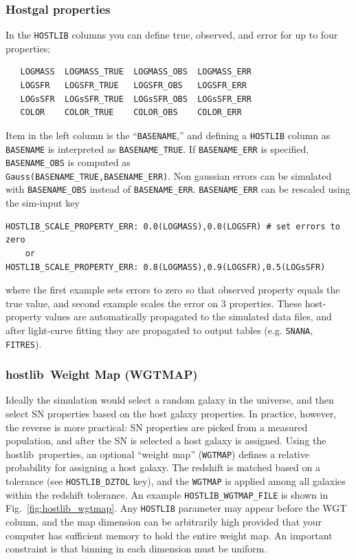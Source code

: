\documentclass[12pt]{article}
\newcommand{\hostlib}{{\sc hostlib}}
\begin{document}
{\subsubsection{Hostgal properties}
\label{sss:hostgal_properties}
In the {\tt HOSTLIB} columns you can define true, observed, and error 
for up to four properties;
\begin{verbatim}
   LOGMASS  LOGMASS_TRUE  LOGMASS_OBS  LOGMASS_ERR 
   LOGSFR   LOGSFR_TRUE   LOGSFR_OBS   LOGSFR_ERR
   LOGsSFR  LOGsSFR_TRUE  LOGsSFR_OBS  LOGsSFR_ERR
   COLOR    COLOR_TRUE    COLOR_OBS    COLOR_ERR
\end{verbatim}
%
Item in the left column is the ``{\tt BASENAME},'' and defining a {\tt HOSTLIB}
column as {\tt BASENAME} is interpreted as {\tt BASENAME\_TRUE}.
If {\tt BASENAME\_ERR} is specified, {\tt BASENAME\_OBS} is computed as \\
%
{\tt Gauss(BASENAME\_TRUE,BASENAME\_ERR)}.
%
Non gaussian errors can be simulated with {\tt BASENAME\_OBS} 
instead of {\tt BASENAME\_ERR}.
{\tt BASENAME\_ERR} can be rescaled using the sim-input key 
\begin{verbatim}    
HOSTLIB_SCALE_PROPERTY_ERR: 0.0(LOGMASS),0.0(LOGSFR) # set errors to zero
    or
HOSTLIB_SCALE_PROPERTY_ERR: 0.8(LOGMASS),0.9(LOGSFR),0.5(LOGsSFR)  
\end{verbatim}
%
where the first example sets errors to zero so that observed property 
equals the true value, and second example scales the error on 3 properties.
%
These host-property values are automatically propagated to the simulated data 
files, and after light-curve fitting they are propagated to output tables 
(e.g. {\tt SNANA}, {\tt FITRES}).



\subsubsection{\hostlib\ Weight Map (WGTMAP)}
\label{sss:hostlib_wgtmap}

Ideally the simulation would select a random galaxy in the universe,
and then select SN properties based on the host galaxy properties.
In practice, however, the reverse is more practical: SN properties 
are picked from a measured population, and after the SN is selected
a host galaxy is assigned.
Using the \hostlib\ properties, an optional ``weight map'' ({\tt WGTMAP}) 
defines a relative probability for assigning a host galaxy. 
The redshift is matched based on a tolerance
(see {\tt HOSTLIB\_DZTOL} key), and the {\tt WGTMAP} is applied among
all galaxies within the redshift tolerance.
An example {\tt HOSTLIB\_WGTMAP\_FILE} is shown in
Fig.~\ref{fig:hostlib_wgtmap}.
Any {\tt HOSTLIB} parameter may appear before the WGT column,
and the map dimension can be arbitrarily high provided that your computer
has sufficient memory to hold the entire weight map.
An important constraint is that binning in each dimension must be uniform.


}
\end{document}
